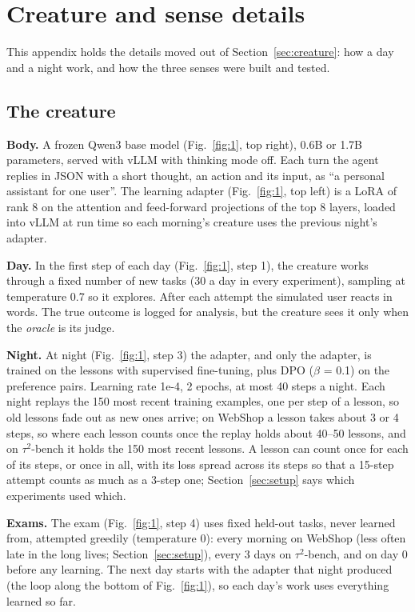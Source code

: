 \section{Creature and sense details}\label{app:details}

This appendix holds the details moved out of Section~\ref{sec:creature}: how a day and a night work, and how the three senses were built and tested.

\subsection{The creature}

\textbf{Body.} A frozen Qwen3 \cite{yang2025qwen3} base model (Fig.~\ref{fig:1}, top right), 0.6B or 1.7B parameters, served with vLLM \cite{kwon2023vllm} with thinking mode off. Each turn the agent replies in JSON with a short thought, an action and its input, as ``a personal assistant for one user''. The learning adapter (Fig.~\ref{fig:1}, top left) is a LoRA \cite{hu2022lora} of rank 8 on the attention and feed-forward projections of the top 8 layers, loaded into vLLM at run time so each morning's creature uses the previous night's adapter.

\textbf{Day.} In the first step of each day (Fig.~\ref{fig:1}, step 1), the creature works through a fixed number of new tasks (30 a day in every experiment), sampling at temperature 0.7 so it explores. After each attempt the simulated user reacts in words. The true outcome is logged for analysis, but the creature sees it only when the \emph{oracle} is its judge.

\textbf{Night.} At night (Fig.~\ref{fig:1}, step 3) the adapter, and only the adapter, is trained on the lessons with supervised fine-tuning, plus DPO \cite{rafailov2023dpo} ($\beta$ = 0.1) on the preference pairs. Learning rate 1e-4, 2 epochs, at most 40 steps a night. Each night replays the 150 most recent training examples, one per step of a lesson, so old lessons fade out as new ones arrive; on WebShop a lesson takes about 3 or 4 steps, so where each lesson counts once the replay holds about 40--50 lessons, and on $\tau^2$-bench it holds the 150 most recent lessons. A lesson can count once for each of its steps, or once in all, with its loss spread across its steps so that a 15-step attempt counts as much as a 3-step one; Section~\ref{sec:setup} says which experiments used which.

\textbf{Exams.} The exam (Fig.~\ref{fig:1}, step 4) uses fixed held-out tasks, never learned from, attempted greedily (temperature 0): every morning on WebShop (less often late in the long lives; Section~\ref{sec:setup}), every 3 days on $\tau^2$-bench, and on day 0 before any learning. The next day starts with the adapter that night produced (the loop along the bottom of Fig.~\ref{fig:1}), so each day's work uses everything learned so far.


